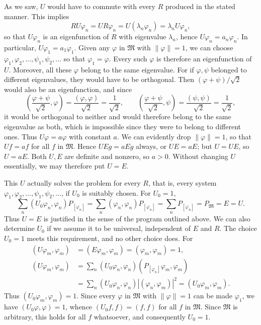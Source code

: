 \documentclass[fontsize=13pt,twoside,openany,headings=normal,parskip=false,bookmarkpackage=false,DIV=calc]{scrbook}
\begin{document}
\hypertarget{origpage-182}{}%
As we saw, $U$ would have to commute with every $R$ produced in the stated manner. This implies
\[
RU\varphi_n=UR\varphi_n=U(\lambda_n\varphi_n)=\lambda_nU\varphi_n,
\]
so that $U\varphi_n$ is an eigenfunction of $R$ with eigenvalue $\lambda_n$, hence $U\varphi_n=a_n\varphi_n$. In particular, $U\varphi_1=a_1\varphi_1$. Given any $\varphi$ in $\mathfrak M$ with $\|\varphi\|=1$, we can choose $\varphi_1,\varphi_2,\ldots,\psi_1,\psi_2,\ldots$ so that $\varphi_1=\varphi$. Every such $\varphi$ is therefore an eigenfunction of $U$. Moreover, all these $\varphi$ belong to the same eigenvalue. For if $\varphi,\psi$ belonged to different eigenvalues, they would have to be orthogonal. Then $(\varphi+\psi)/\sqrt2$ would also be an eigenfunction, and since
\[
\left(\frac{\varphi+\psi}{\sqrt2},\varphi\right)=\frac{(\varphi,\varphi)}{\sqrt2}=\frac1{\sqrt2},\qquad
\left(\frac{\varphi+\psi}{\sqrt2},\psi\right)=\frac{(\psi,\psi)}{\sqrt2}=\frac1{\sqrt2},
\]
it would be orthogonal to neither and would therefore belong to the same eigenvalue as both, which is impossible since they were to belong to different ones. Thus $U\varphi=a\varphi$ with constant $a$. We can evidently drop $\|\varphi\|=1$, so that $Uf=af$ for all $f$ in $\mathfrak M$. Hence $UEg=aEg$ always, or $UE=aE$; but $U=UE$, so $U=aE$. Both $U,E$ are definite and nonzero, so $a>0$. Without changing $U$ essentially, we may therefore put $U=E$.

This $U$ actually solves the problem for every $R$, that is, every system $\varphi_1,\varphi_2,\ldots,\psi_1,\psi_2,\ldots$, if $U_0$ is suitably chosen. For $U_0=1$,
\[
\sum_n(U_0\varphi_n,\varphi_n)P_{[\varphi_n]}
=\sum_n(\varphi_n,\varphi_n)P_{[\varphi_n]}
=\sum_nP_{[\varphi_n]}=P_{\mathfrak M}=E=U.
\]
Thus $U=E$ is justified in the sense of the program outlined above. We can also determine $U_0$ if we assume it to be universal, independent of $E$ and $R$. The choice $U_0=1$ meets this requirement, and no other choice does. For
\begin{align*}
(U\varphi_m,\varphi_m)&=(E\varphi_m,\varphi_m)=(\varphi_m,\varphi_m)=1,\\
(U\varphi_m,\varphi_m)&=\sum_n(U_0\varphi_n,\varphi_n)(P_{[\varphi_n]}\varphi_m,\varphi_m)\\
&=\sum_n(U_0\varphi_n,\varphi_n)|(\varphi_n,\varphi_m)|^2
=(U_0\varphi_m,\varphi_m).
\end{align*}
Thus $(U_0\varphi_m,\varphi_m)=1$. Since every $\varphi$ in $\mathfrak M$ with $\|\varphi\|=1$ can be made $\varphi_1$, we have $(U_0\varphi,\varphi)=1$, whence $(U_0f,f)=(f,f)$ for all $f$ in $\mathfrak M$. Since $\mathfrak M$ is arbitrary, this holds for all $f$ whatsoever, and consequently $U_0=1$.
\end{document}
